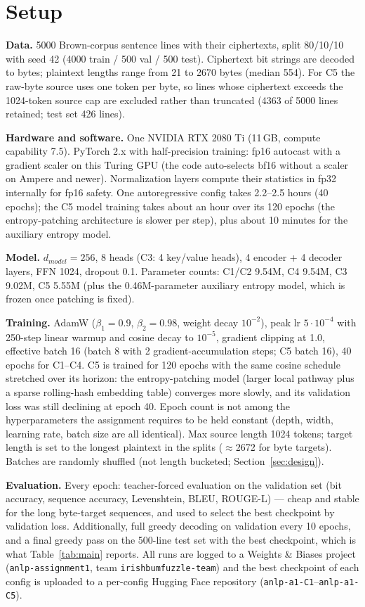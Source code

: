 \documentclass[11pt]{article}
\begin{document}
\section{Setup}
\label{sec:setup}
\textbf{Data.} 5000 Brown-corpus sentence lines with their ciphertexts, split
80/10/10 with seed 42 (4000 train / 500 val / 500 test). Ciphertext bit strings
are decoded to bytes; plaintext lengths range from 21 to 2670 bytes (median
554). For C5 the raw-byte source uses one token per byte, so lines whose
ciphertext exceeds the 1024-token source cap are excluded rather than truncated
(4363 of 5000 lines retained; test set 426 lines).

\textbf{Hardware and software.} One NVIDIA RTX 2080 Ti (11\,GB, compute
capability 7.5). PyTorch 2.x with half-precision training: fp16 autocast with a
gradient scaler on this Turing GPU (the code auto-selects bf16 without a scaler
on Ampere and newer). Normalization layers compute their statistics in fp32
internally for fp16 safety. One autoregressive config takes 2.2--2.5 hours
(40 epochs); the C5 model training takes about an hour over its 120 epochs
(the entropy-patching architecture is slower per step), plus about 10 minutes
for the auxiliary entropy model.

\textbf{Model.} $d_{model}=256$, 8 heads (C3: 4 key/value heads), 4 encoder + 4
decoder layers, FFN 1024, dropout 0.1. Parameter counts: C1/C2 9.54M, C4 9.54M,
C3 9.02M, C5 5.55M (plus the 0.46M-parameter auxiliary entropy model,
which is frozen once patching is fixed).

\textbf{Training.} AdamW ($\beta_1{=}0.9$, $\beta_2{=}0.98$, weight decay
$10^{-2}$), peak lr $5\cdot10^{-4}$ with 250-step linear warmup and cosine decay
to $10^{-5}$, gradient clipping at 1.0, effective batch 16 (batch 8 with 2
gradient-accumulation steps; C5 batch 16), 40 epochs for C1--C4. C5 is trained
for 120 epochs with the same cosine schedule stretched over its horizon:
the entropy-patching model (larger local pathway plus a sparse rolling-hash
embedding table) converges more slowly, and its validation loss was still
declining at epoch 40. Epoch count is not among the hyperparameters the
assignment requires to be held constant (depth, width, learning rate, batch
size are all identical). Max source length 1024 tokens; target length is set to the longest plaintext in the splits
($\approx$2672 for byte targets). Batches are randomly shuffled (not length
bucketed; Section~\ref{sec:design}).

\textbf{Evaluation.} Every epoch: teacher-forced evaluation on the validation set
(bit accuracy, sequence accuracy, Levenshtein, BLEU, ROUGE-L) --- cheap and stable
for the long byte-target sequences, and used to select the best checkpoint by
validation loss. Additionally, full greedy decoding on validation every 10 epochs,
and a final greedy pass on the 500-line test set with the best checkpoint, which
is what Table~\ref{tab:main} reports. All runs are logged to a Weights \& Biases
project (\texttt{anlp-assignment1}, team \texttt{irishbumfuzzle-team}) and the
best checkpoint of each config is uploaded to a per-config Hugging Face
repository (\texttt{anlp-a1-C1}--\texttt{anlp-a1-C5}).
\end{document}
